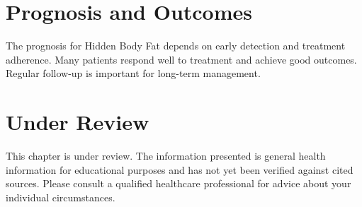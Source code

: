 \section*{Prognosis and Outcomes}
The prognosis for Hidden Body Fat depends on early detection and treatment adherence. Many patients respond well to treatment and achieve good outcomes. Regular follow-up is important for long-term management.
\section*{Under Review}
This chapter is under review. The information presented is general health information for educational purposes and has not yet been verified against cited sources. Please consult a qualified healthcare professional for advice about your individual circumstances.


\clearpage
